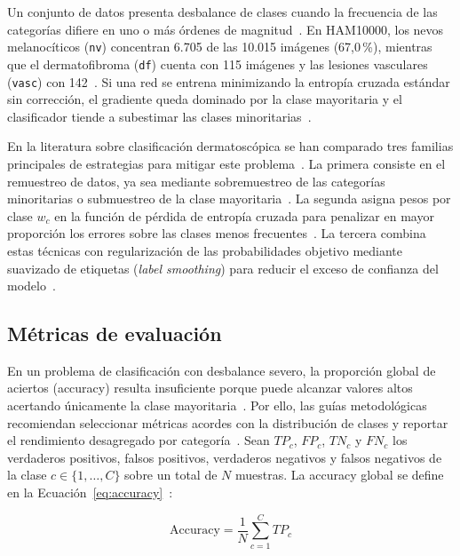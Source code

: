 Un conjunto de datos presenta desbalance de clases cuando la frecuencia de las categorías difiere en uno o más órdenes de magnitud~\cite{hu2024multiscale}. En HAM10000, los nevos melanocíticos (\texttt{nv}) concentran 6.705 de las 10.015 imágenes (67,0\,\%), mientras que el dermatofibroma (\texttt{df}) cuenta con 115 imágenes y las lesiones vasculares (\texttt{vasc}) con 142~\cite{tschandl2018ham10000}. Si una red se entrena minimizando la entropía cruzada estándar sin corrección, el gradiente queda dominado por la clase mayoritaria y el clasificador tiende a subestimar las clases minoritarias~\cite{hu2024multiscale}.

En la literatura sobre clasificación dermatoscópica se han comparado tres familias principales de estrategias para mitigar este problema~\cite{hu2024multiscale}. La primera consiste en el remuestreo de datos, ya sea mediante sobremuestreo de las categorías minoritarias o submuestreo de la clase mayoritaria~\cite{hu2024multiscale}. La segunda asigna pesos por clase $w_c$ en la función de pérdida de entropía cruzada para penalizar en mayor proporción los errores sobre las clases menos frecuentes~\cite{hu2024multiscale}. La tercera combina estas técnicas con regularización de las probabilidades objetivo mediante suavizado de etiquetas (\textit{label smoothing}) para reducir el exceso de confianza del modelo~\cite{hu2024multiscale}.

\subsection{Métricas de evaluación}

En un problema de clasificación con desbalance severo, la proporción global de aciertos (accuracy) resulta insuficiente porque puede alcanzar valores altos acertando únicamente la clase mayoritaria~\cite{maierhein2024metrics}. Por ello, las guías metodológicas recomiendan seleccionar métricas acordes con la distribución de clases y reportar el rendimiento desagregado por categoría~\cite{maierhein2024metrics}. Sean $TP_c$, $FP_c$, $TN_c$ y $FN_c$ los verdaderos positivos, falsos positivos, verdaderos negativos y falsos negativos de la clase $c \in \{1, \dots, C\}$ sobre un total de $N$ muestras. La accuracy global se define en la Ecuación~\ref{eq:accuracy}~\cite{maierhein2024metrics}:

\begin{equation}
  \text{Accuracy} = \frac{1}{N} \sum_{c=1}^{C} TP_c
  \label{eq:accuracy}
\end{equation}

